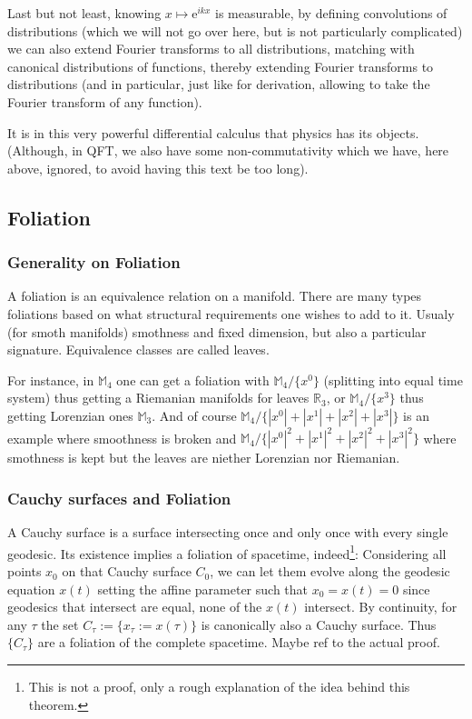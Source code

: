 \documentclass[a4paper,11pt]{article}
\numberwithin{equation}{section}
\theoremstyle{definition}
\newcommand{\e}{{\mathrm{e}}}
\begin{document}
    Last but not least, knowing $x\mapsto \e^{ikx}$ is measurable, by defining convolutions of distributions (which we will not go over here, but is not particularly complicated) we can also extend Fourier transforms to all distributions, matching with canonical distributions of functions, thereby extending Fourier transforms to distributions (and in particular, just like for derivation, allowing to take the Fourier transform of any function).

    It is in this very powerful differential calculus that physics has its objects. (Although, in QFT, we also have some non-commutativity which we have, here above, ignored, to avoid having this text be too long).
\subsection{Foliation}
\subsubsection{Generality on Foliation}
A foliation is an equivalence relation on a manifold. There are many types foliations based on what structural requirements one wishes to add to it. Usualy (for smoth manifolds) smothness and fixed dimension, but also a particular signature. Equivalence classes are called leaves.

For instance, in $\mathbb{M}_4$ one can get a foliation with $\mathbb{M}_4/\{x^0\}$ (splitting into equal time system) thus getting a Riemanian manifolds for leaves $\mathbb{R}_3$, or $\mathbb{M}_4/\{x^3\}$ thus getting Lorenzian ones $\mathbb{M}_3$. And of course $\mathbb{M}_4/\{|x^0|+|x^1|+|x^2|+|x^3|\}$ is an example where smoothness is broken and $\mathbb{M}_4/\{|x^0|^2+|x^1|^2+|x^2|^2+|x^3|^2\}$ where smothness is kept but the leaves are niether Lorenzian nor Riemanian.

\subsubsection{Cauchy surfaces and Foliation}
A Cauchy surface is a surface intersecting once and only once with every single geodesic. Its existence implies a foliation of spacetime, indeed\footnote{This is not a proof, only a rough explanation of the idea behind this theorem.}:
Considering all points $x_0$ on that Cauchy surface $C_0$, we can let them evolve along the geodesic equation $x(t)$ setting the affine parameter such that $x_0=x(t)=0$ since geodesics that intersect are equal, none of the $x(t)$ intersect. By continuity, for any $\tau$ the set $C_\tau := \{x_\tau := x(\tau)\}$ is canonically also a Cauchy surface. Thus $\{C_\tau\}$ are a foliation of the complete spacetime. \color{red} Maybe ref to the actual proof.\color{black}
\end{document}
